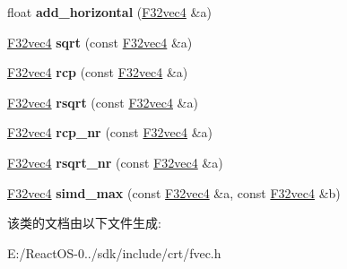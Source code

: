 \begin{DoxyCompactItemize}
float {\bfseries add\+\_\+horizontal} (\hyperlink{class_f32vec4}{F32vec4} \&a)
\item 
\mbox{\label{class_f32vec4_abdf3ea41996726ec04e23447b85044a0}} 
\hyperlink{class_f32vec4}{F32vec4} {\bfseries sqrt} (const \hyperlink{class_f32vec4}{F32vec4} \&a)
\item 
\mbox{\label{class_f32vec4_a4300c71d4624d8008c44a48454032a2f}} 
\hyperlink{class_f32vec4}{F32vec4} {\bfseries rcp} (const \hyperlink{class_f32vec4}{F32vec4} \&a)
\item 
\mbox{\label{class_f32vec4_a6421368a206077977159a575e7f1a5a4}} 
\hyperlink{class_f32vec4}{F32vec4} {\bfseries rsqrt} (const \hyperlink{class_f32vec4}{F32vec4} \&a)
\item 
\mbox{\label{class_f32vec4_ab1da55da2cba0cbb57edae063afb6a84}} 
\hyperlink{class_f32vec4}{F32vec4} {\bfseries rcp\+\_\+nr} (const \hyperlink{class_f32vec4}{F32vec4} \&a)
\item 
\mbox{\label{class_f32vec4_a112c404fead3fa42faf38b4cd0303e37}} 
\hyperlink{class_f32vec4}{F32vec4} {\bfseries rsqrt\+\_\+nr} (const \hyperlink{class_f32vec4}{F32vec4} \&a)
\item 
\mbox{\label{class_f32vec4_a03b40688e26797eaf9bd9eaac31507ca}} 
\hyperlink{class_f32vec4}{F32vec4} {\bfseries simd\+\_\+max} (const \hyperlink{class_f32vec4}{F32vec4} \&a, const \hyperlink{class_f32vec4}{F32vec4} \&b)
\end{DoxyCompactItemize}


该类的文档由以下文件生成\+:\begin{DoxyCompactItemize}
\item 
E\+:/\+React\+O\+S-\/0../sdk/include/crt/fvec.\+h\end{DoxyCompactItemize}
